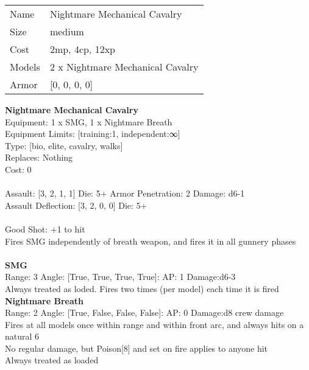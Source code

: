 \begin{tabular}{ll}
  Name & Nightmare Mechanical Cavalry \\
  Size & medium\\
  Cost & 2mp, 4cp, 12xp\\
  Models & 2 x Nightmare Mechanical Cavalry\\
  Armor & [0, 0, 0, 0]\\
\end{tabular}

\noindent 

{\bf Nightmare Mechanical Cavalry } \\
Equipment: 1 x SMG, 1 x Nightmare Breath \\
Equipment Limits: [training:1, independent:∞] \\
Type: [bio, elite, cavalry, walks] \\
Replaces: Nothing \\
Cost: 0\\
\ \\
Assault: [3, 2, 1, 1] Die: 5+ Armor Penetration: 2 Damage: d6-1 \\
Assault Deflection: [3, 2, 0, 0] Die: 5+\\
\indent  
\ \\
Good Shot: +1 to hit\\ 
Fires SMG independently of breath weapon, and fires it in all gunnery phases\\ 

\ \\
{\bf SMG } \\



Range: 3  Angle: [True, True, True, True]: AP: 1 Damage:d6-3 \\
Always treated as loded. Fires two times (per model) each time it is fired\\ 




{\bf Nightmare Breath } \\



Range: 2  Angle: [True, False, False, False]: AP: 0 Damage:d8 crew damage \\
Fires at all models once within range and within front arc, and always hits on a natural 6\\ 
No regular damage, but Poison[8] and set on fire applies to anyone hit\\ 
Always treated as loaded\\ 





